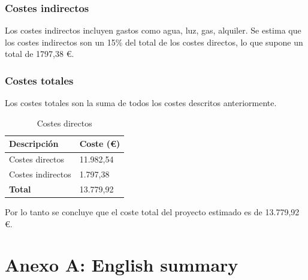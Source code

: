 \documentclass[12pt]{report} %
\begin{document}
	\subsection{Costes indirectos}
	Los costes indirectos incluyen gastos como agua, luz, gas, alquiler. Se estima que los costes indirectos son un 15\% del total
	de los costes directos, lo que supone un total de 1797,38 €.
	\subsection{Costes totales}

	Los costes totales son la suma de todos los costes descritos anteriormente.
	\begin{table}[H]
		\centering
		\caption{Costes directos}
		\begin{tabular}{ll}
				\toprule
				\textbf{Descripción} & \textbf{Coste (€)}\\
				\midrule
				Costes directos & 11.982,54  \\
				Costes indirectos & 1.797,38  \\
				\bottomrule
				\textbf{Total} & 13.779,92
		\end{tabular}
	\end{table}
	Por lo tanto se concluye que el coste total del proyecto estimado es de 13.779,92 €.



\nocite{*} %

\clearpage
{}
\printbibliography




\chapter* {Anexo A: English summary}
\end{document}
